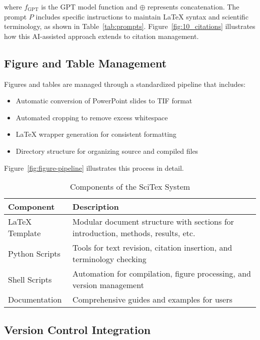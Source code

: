 \documentclass[preprint,review,12pt]{elsarticle}%
\begin{document}
\begin{frontmatter}
where $f_{\text{GPT}}$ is the GPT model function and $\oplus$ represents concatenation. The prompt $P$ includes specific instructions to maintain LaTeX syntax and scientific terminology, as shown in Table~\ref{tab:prompts}. Figure~\ref{fig:10_citations} illustrates how this AI-assisted approach extends to citation management.


\subsection{Figure and Table Management}
\label{subsec:figure-management}

Figures and tables are managed through a standardized pipeline that includes:

\begin{itemize}
    \item Automatic conversion of PowerPoint slides to TIF format
    \item Automated cropping to remove excess whitespace
    \item LaTeX wrapper generation for consistent formatting
    \item Directory structure for organizing source and compiled files
\end{itemize}

Figure~\ref{fig:figure-pipeline} illustrates this process in detail.


\begin{table}[h!]
\centering
\caption{Components of the SciTex System}
\label{tab:components}
\begin{tabular}{lp{8cm}}
\hline
\textbf{Component} & \textbf{Description} \\
\hline
LaTeX Template & Modular document structure with sections for introduction, methods, results, etc. \\
Python Scripts & Tools for text revision, citation insertion, and terminology checking \\
Shell Scripts & Automation for compilation, figure processing, and version management \\
Documentation & Comprehensive guides and examples for users \\
\hline
\end{tabular}
\end{table}

\subsection{Version Control Integration}
\label{subsec:version-control}


\end{frontmatter}
\end{document}
